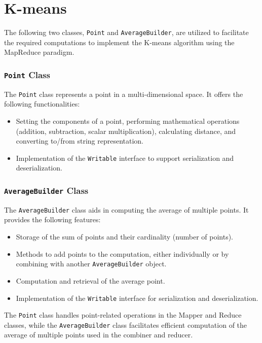 \documentclass[parskip=full]{report}
\begin{document}
\chapter{K-means}

	The following two classes, \texttt{Point} and \texttt{AverageBuilder}, are utilized to facilitate the required computations to implement the K-means algorithm using the MapReduce paradigm.

	\subsection*{\texttt{Point} Class}

	The \texttt{Point} class represents a point in a multi-dimensional space. It offers the following functionalities:

	\begin{itemize}
		\item Setting the components of a point, performing mathematical operations (addition, subtraction, scalar multiplication), calculating distance, and converting to/from string representation.
		\item Implementation of the \texttt{Writable} interface to support serialization and deserialization.

	\end{itemize}

	\subsection*{\texttt{AverageBuilder} Class}

	The \texttt{AverageBuilder} class aids in computing the average of multiple points. It provides the following features:

	\begin{itemize}
		\item Storage of the sum of points and their cardinality (number of points).
		\item Methods to add points to the computation, either individually or by combining with another \texttt{AverageBuilder} object.
		\item Computation and retrieval of the average point.
		\item Implementation of the \texttt{Writable} interface for serialization and deserialization.
	\end{itemize}

	The \texttt{Point} class handles point-related operations in the Mapper and Reduce classes, while the \texttt{AverageBuilder} class facilitates efficient computation of the average of multiple points used in the combiner and reducer.
\end{document}
